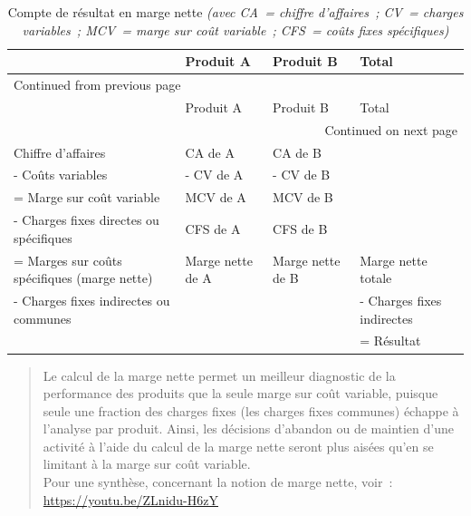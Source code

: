 \documentclass{kaobook}
\begin{document}
\begin{longtable}{llll}
\caption{Compte de résultat en marge nette \emph{(avec CA = chiffre d'affaires ; CV = charges variables ; MCV = marge sur coût variable ; CFS = coûts fixes spécifiques)}}
\\
 & Produit A & Produit B & Total\\
\hline
\endfirsthead
\multicolumn{4}{l}{Continued from previous page} \\
\hline

 & Produit A & Produit B & Total \\

\hline
\endhead
\hline\multicolumn{4}{r}{Continued on next page} \\
\endfoot
\endlastfoot
\hline
Chiffre d'affaires & CA de A & CA de B & \\
- Coûts variables & - CV de A & - CV de B & \\
= Marge sur coût variable & MCV de A & MCV de B & \\
- Charges fixes directes ou spécifiques & CFS de A & CFS de B & \\
= Marges sur coûts spécifiques (marge nette) & Marge nette de A & Marge nette de B & Marge nette totale\\
- Charges fixes indirectes ou communes &  &  & - Charges fixes indirectes\\
 &  &  & = Résultat\\
\end{longtable}

\begin{quote}
Le calcul de la marge nette permet un meilleur diagnostic de la performance des produits que la seule marge sur coût variable, puisque seule une fraction des charges fixes (les charges fixes communes) échappe à l'analyse par produit. Ainsi, les décisions d'abandon ou de maintien d'une activité à l'aide du calcul de la marge nette seront plus aisées qu'en se limitant à la marge sur coût variable.\\
Pour une synthèse, concernant la notion de marge nette, voir : \url{https://youtu.be/ZLnidu-H6zY}\\
\end{quote}
\end{document}
